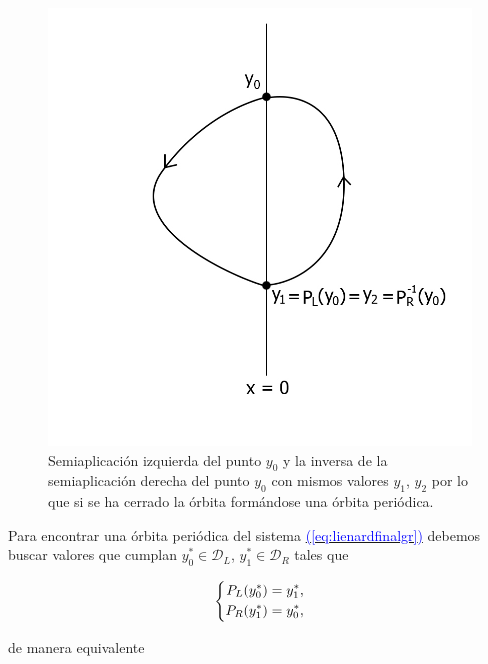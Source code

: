 \documentclass[12pt,a4paper]{report} %
\newcommand{\eref}[1]{\hyperref[#1]{\textcolor{blue}{(\ref*{#1})}}}
\newcommand{\eref}[1]{\hyperref[#1]{\textcolor{blue}{\textit{(\ref*{#1})}}}}
\begin{document}
	\begin{figure}[h]
		\centering
		\includegraphics[width=1.1\textwidth,center]{aplipoincareL-Rcerrado.jpg}
		\caption{Semiaplicación izquierda del punto $y_0$ y la inversa de la semiaplicación derecha del punto $y_0$ con mismos valores $y_1$, $y_2$ por lo que si se ha cerrado la órbita formándose una órbita periódica.}
		\label{fig:aplipoincareL-Rcerrado}
	\end{figure}\smallskip
	
	\newpage
	
	\vspace{0.5cm}\noindent Para encontrar una órbita periódica del sistema \eref{eq:lienardfinalgr} debemos buscar valores que cumplan $y_0^*\in \mathcal{D}_L$, $y_1^*\in \mathcal{D}_R$ tales que
	
	\begin{equation*}
		\label{eq:ej1}
		\scalebox{1}{$\displaystyle
			\left\{
			\begin{aligned}
				P_L(y_0^*)=y_1^*, \\
				P_R(y_1^*)=y_0^* ,
			\end{aligned}
			\right. 
			$}
	\end{equation*}\smallskip
	
	\noindent de manera equivalente
	
\end{document}
